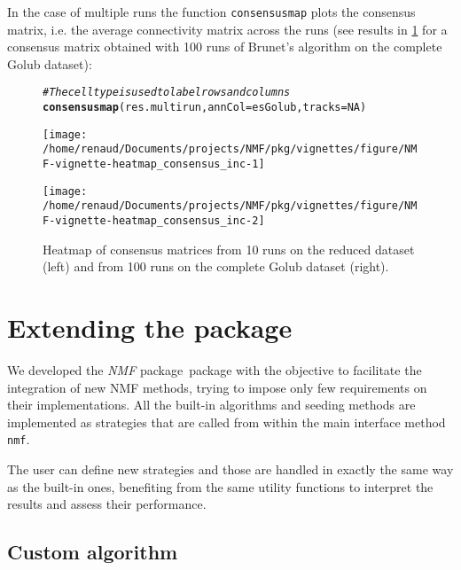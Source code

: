\documentclass[a4paper]{article}\usepackage[]{graphicx}\usepackage[]{color}
\makeatletter
\newcommand{\hlnum}[1]{\textcolor[rgb]{0.686,0.059,0.569}{#1}}%
\newcommand{\hlcom}[1]{\textcolor[rgb]{0.678,0.584,0.686}{\textit{#1}}}%
\newcommand{\hlstd}[1]{\textcolor[rgb]{0.345,0.345,0.345}{#1}}%
\newcommand{\hlkwc}[1]{\textcolor[rgb]{0.333,0.667,0.333}{#1}}%
\newcommand{\hlkwd}[1]{\textcolor[rgb]{0.737,0.353,0.396}{\textbf{#1}}}%
\newenvironment{kframe}{%
 \def\at@end@of@kframe{}%
 \ifinner\ifhmode%
  \def\at@end@of@kframe{\end{minipage}}%
  \begin{minipage}{\columnwidth}%
 \fi\fi%
 \def\FrameCommand##1{\hskip\@totalleftmargin \hskip-\fboxsep
 \colorbox{shadecolor}{##1}\hskip-\fboxsep
     \hskip-\linewidth \hskip-\@totalleftmargin \hskip\columnwidth}%
 \MakeFramed {\advance\hsize-\width
   \@totalleftmargin\z@ \linewidth\hsize
   \@setminipage}}%
 {\par\unskip\endMakeFramed%
 \at@end@of@kframe}
\newenvironment{knitrout}{}{} %
\let\code=\texttt
\newcommand{\pkgname}[1]{\textit{#1}\xspace}
\newcommand{\Rpkg}[1]{\pkgname{#1} package\xspace}
\newcommand{\nmfpack}{\Rpkg{NMF}}
\makeatother
\begin{document}
In the case of multiple runs the function \code{consensusmap} plots the consensus matrix, i.e. the average connectivity matrix across the runs (see results in \cref{fig:heatmap_consensus} for a consensus matrix obtained with 100 runs of Brunet's algorithm on the complete 
Golub dataset):

\begin{figure}[ht]
\begin{knitrout}
\color{fgcolor}\begin{kframe}
\begin{alltt}
\hlcom{# The cell type is used to label rows and columns }
\hlkwd{consensusmap}\hlstd{(res.multirun,} \hlkwc{annCol}\hlstd{=esGolub,} \hlkwc{tracks}\hlstd{=}\hlnum{NA}\hlstd{)}
\end{alltt}
\end{kframe}
\texttt{[image: /home/renaud/Documents/projects/NMF/pkg/vignettes/figure/NMF-vignette-heatmap\_consensus\_inc-1]} 

\texttt{[image: /home/renaud/Documents/projects/NMF/pkg/vignettes/figure/NMF-vignette-heatmap\_consensus\_inc-2]} 

\end{knitrout}

\caption{Heatmap of consensus matrices from 10 runs on the reduced dataset
(left) and from 100 runs on the complete Golub dataset (right).}
\label{fig:heatmap_consensus}
\end{figure}
 
\section{Extending the package}

We developed the \nmfpack\ package with the objective to facilitate the integration of new NMF methods, trying to impose only few requirements on their implementations. 
All the built-in algorithms and seeding methods are implemented as strategies that are called from within the main interface method \code{nmf}. 

The user can define new strategies and those are handled in exactly the same way as the built-in ones, benefiting from the same utility functions to interpret the 
results and assess their performance. 

\subsection{Custom algorithm}
%
%
\end{document}
